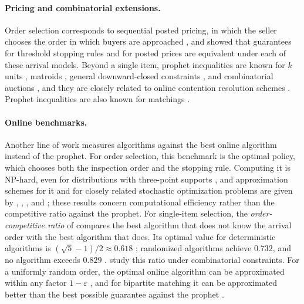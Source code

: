 \documentclass[11pt]{article}
\theoremstyle{definition}
\theoremstyle{remark}
\begin{document}
\paragraph{Pricing and combinatorial extensions.}
Order selection corresponds to sequential posted pricing, in which the seller chooses the
order in which buyers are approached \citep{CHMS10,Yan11,BGLPS21}, and \citet{CFPV19} showed
that guarantees for threshold stopping rules and for posted prices are equivalent under each
of these arrival models. Beyond a single item, prophet inequalities are known for $k$ units
\citep{HKS07,Alaei14}, matroids \citep{KW19}, general downward-closed constraints
\citep{Rubinstein16,RS17}, and combinatorial auctions \citep{DFKL20}, and they are closely
related to online contention resolution schemes \citep{FSZ21,LS18}. Prophet inequalities
are also known for matchings \citep{EFGT22}.

\paragraph{Online benchmarks.}
Another line of work measures algorithms against the best online algorithm instead of the
prophet. For order selection, this benchmark is the optimal policy, which chooses both the
inspection order and the stopping rule. Computing it is NP-hard, even for distributions with
three-point supports \citep{ASZ20}, and approximation schemes for it and for closely related
stochastic optimization problems are given by \citet{CEGMM10}, \citet{FLX18}, \citet{LPPSS21},
and \citet{SS21}; these results concern computational efficiency rather than the competitive
ratio against the prophet. For single-item selection, the \emph{order-competitive ratio} of
\citet{EFGT23} compares the best algorithm that does not know the arrival order with the best
algorithm that does. Its optimal value for deterministic algorithms is
$(\sqrt5-1)/2\approx0.618$ \citep{EFGT23,CEFGST26}; randomized algorithms achieve $0.732$, and
no algorithm exceeds $0.829$ \citep{CST24}. \citet{EG23} study this ratio under combinatorial
constraints. For a uniformly random order, the optimal online algorithm can be approximated
within any factor $1-\varepsilon$ \citep{DGRTT23}, and for bipartite matching it can be
approximated better than the best possible guarantee against the prophet \citep{PPSW24}.
\end{document}
